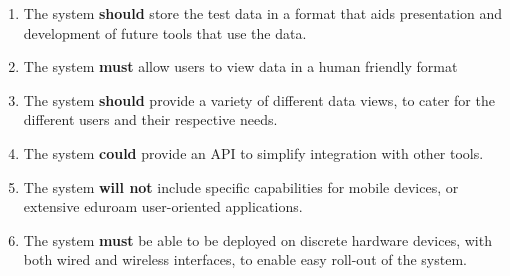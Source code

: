 \begin{enumerate}
    \item The system \textbf{should} store the test data in a format that aids
presentation and development of future tools that use the data.
    \item The system \textbf{must} allow users to view data in a human friendly format
    \item The system \textbf{should} provide a variety of different data views, to cater
for the different users and their respective needs.
    \item The system \textbf{could} provide an API to simplify integration with other tools.
    \item The system \textbf{will not} include specific capabilities for mobile devices,
or extensive eduroam user-oriented applications.
    \item The system \textbf{must} be able to be deployed on discrete hardware devices,
with both wired and wireless interfaces, to enable easy roll-out of the system.
\end{enumerate}
